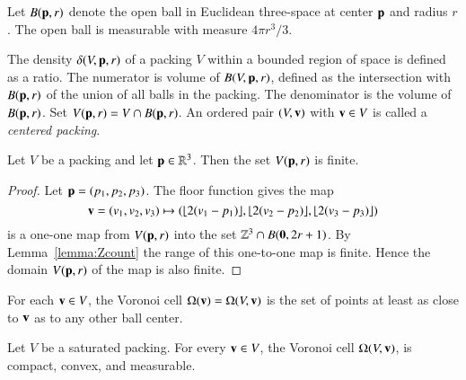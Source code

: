 Let $B({\mathbf p},r)$ denote the open ball in
Euclidean three-space at center ${\mathbf p}$ and radius $r$.  The open ball
is measurable with measure $4\pi r^3/3$.
%
%

The density $\delta( V,{\mathbf p},r)$ of a packing $ V$ within a bounded
region of space is defined as a
ratio. The numerator is volume of $B( V,{\mathbf p},r)$, defined as
the intersection with
$B({\mathbf p},r)$ of the union of all balls in the packing.
The denominator is the volume of $B({\mathbf p},r)$.
Set
$ V({\mathbf p},r) =  V \cap
B({\mathbf p},r)$. %
An ordered pair $( V,{\mathbf v})$ with ${\mathbf v}\in V$ is called a {\it centered packing}.
%
%
%

\begin{lemma}
\label{lemma:V-finite}
Let $ V$ be a packing and let ${\mathbf p}\in\mathbb{R}^3$.
Then the set $ V({\mathbf p},r)$ is finite.
\end{lemma}

\begin{proof}  Let ${\mathbf p} = (p_1,p_2,p_3)$. The floor function gives the map
$${\mathbf v}=(v_1,v_2,v_3)\mapsto (\lfloor 2(v_1-p_1)
\rfloor, \lfloor 2(v_2-p_2) \rfloor, \lfloor 2(v_3-p_3) \rfloor)$$
is a one-one map from $ V({\mathbf p},r)$ into the set $\mathbb{Z}^3\cap B({\mathbf 0},2r + 1)$.  By Lemma~\ref{lemma:Zcount} the range of this one-to-one map is finite. 
Hence the domain $ V({\mathbf p},r)$ of the map is also finite.
\end{proof}
%


\begin{definition}\label{def:voronoi}
 For each ${\mathbf v}\in  V$, the Voronoi cell%
$\Omega({\mathbf v})=\Omega( V,{\mathbf v})$
is the set of points at least as close to ${\mathbf v}$ as to
any other ball center. 
\end{definition}


\begin{lemma}
Let $ V$ be a saturated packing.  For every ${\mathbf v}\in  V$, 
the Voronoi cell $\Omega( V,{\mathbf v})$,  is
compact, convex, and measurable.
\end{lemma}

